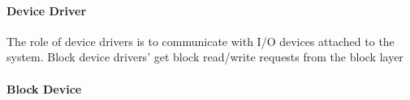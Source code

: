 \paragraph{Device Driver}
The role of device drivers is to communicate with I/O devices attached to the system.
Block device drivers' get block read/write requests from the block layer

\paragraph{Block Device}







